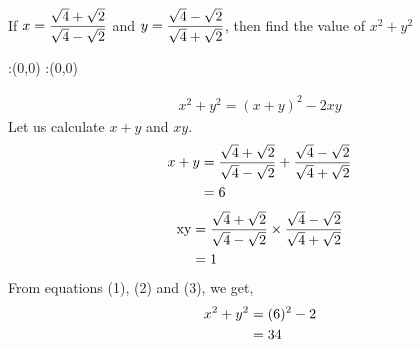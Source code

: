 

\question[2] If $x = \dfrac{\sqrt{4}+\sqrt{2}}{\sqrt{4}-\sqrt{2}}$
and $y = \dfrac{\sqrt{4}-\sqrt{2}}{\sqrt{4}+\sqrt{2}}$, then find
the value of $x^2+y^2$


\watchout

\ifprintanswers
  \begin{marginfigure}
      :(0,0)
      :(0,0)
    \figdrawbegin{}
      \figdrawline [100,101]
    \figdrawend
    \figvisu{\figBoxA}{}{%
    }
    \centerline{\box\figBoxA}
  \end{marginfigure}
\fi 

\begin{solution}[\halfpage]
  \begin{align}
    x^2+y^2=(x+y)^2 - 2xy
  \end{align}
  Let us calculate $x+y$ and $xy$.
  \begin{align}
    x + y &= \dfrac{\sqrt{4}+\sqrt{2}}{\sqrt{4}-\sqrt{2}} +
      \dfrac{\sqrt{4}-\sqrt{2}}{\sqrt{4}+\sqrt{2}} \\ \nonumber
          &= 6
  \end{align}
  \begin{align}
    \text{xy} &= \dfrac{\sqrt{4}+\sqrt{2}}{\sqrt{4}-\sqrt{2}} \times
      \dfrac{\sqrt{4}-\sqrt{2}}{\sqrt{4}+\sqrt{2}} \\ \nonumber
          &= 1
  \end{align}
  From equations (1), (2) and (3), we get,
  \begin{align}
    x^2 + y^2 &= (6)^2 - 2 \\ \nonumber
              &= 34
  \end{align}
  
\end{solution}

